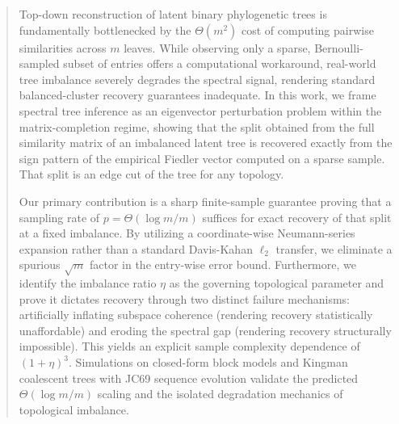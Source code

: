 \begin{abstract}
Top-down reconstruction of latent binary phylogenetic trees is fundamentally bottlenecked by the $\Theta(m^2)$ cost of computing pairwise similarities across $m$ leaves. While observing only a sparse, Bernoulli-sampled subset of entries offers a computational workaround, real-world tree imbalance severely degrades the spectral signal, rendering standard balanced-cluster recovery guarantees inadequate. 
In this work, we frame spectral tree inference as an eigenvector perturbation problem within the matrix-completion regime, showing that the split obtained from the full similarity matrix of an imbalanced latent tree is recovered exactly from the sign pattern of the empirical Fiedler vector computed on a sparse sample. That split is an edge cut of the tree for any topology.

Our primary contribution is a sharp finite-sample guarantee proving that a sampling rate of $p = \Theta(\log m / m)$ suffices for exact recovery of that split at a fixed imbalance. By utilizing a coordinate-wise Neumann-series expansion rather than a standard Davis-Kahan $\ell_2$ transfer, we eliminate a spurious $\sqrt{m}$ factor in the entry-wise error bound. 
Furthermore, we identify the imbalance ratio $\eta$ as the governing topological parameter and prove it dictates recovery through two distinct failure mechanisms: artificially inflating subspace coherence (rendering recovery statistically unaffordable) and eroding the spectral gap (rendering recovery structurally impossible). 
This yields an explicit sample complexity dependence of $(1+\eta)^3$. Simulations on closed-form block models and Kingman coalescent trees with JC69 sequence evolution validate the predicted $\Theta(\log m / m)$ scaling and the isolated degradation mechanics of topological imbalance.
\end{abstract}
